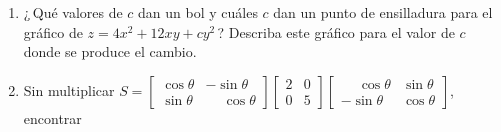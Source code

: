 \documentclass[12pt,a4paper]{article}
\newcommand\1{\mbox{\,\vrule height-0.8pt depth1.0pt width2pc\,}}
\newcommand\2{\mbox{\,\vrule height-0.8pt depth1.0pt width1pc\,}}
\newcommand{\pa}{\partial}
\def\ph{\phantom{-}}
\begin{document}
\begin{enumerate}

\item ¿\,Qué valores de $c$ dan un bol y cuáles $c$ dan un punto de ensilladura para el gr\'afico de $z=4x^2+12xy+cy^2$\,? Describa este gr\'afico para el valor de $c$ donde se produce el cambio.

\item Sin multiplicar $S={\left[\begin{matrix}
      \cos\theta & -\sin\theta\\ \sin\theta & \ph
      \cos\theta\end{matrix}\right]}
  {\left[\begin{matrix} 2&0\\ 0&5\end{matrix}\right]}
  {\left[\begin{matrix}  \ph\cos\theta &
      \sin\theta\\  -\sin\theta & \cos\theta
    \end{matrix}\right]}$,\; encontrar


\end{enumerate}
\end{document}
